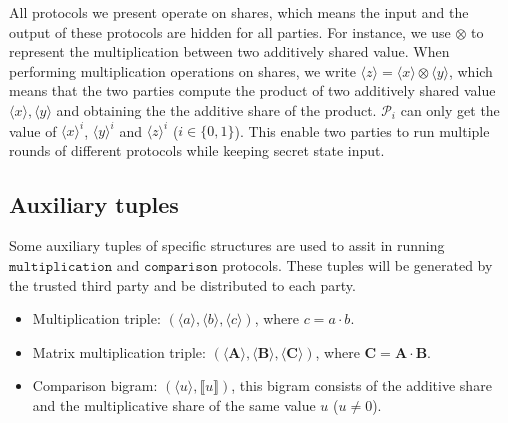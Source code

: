 \documentclass[letterpaper]{article} %
\begin{document}
    All protocols we present operate on shares, which means
    the input and the output of these protocols are hidden for all parties.
    For instance, we use $\otimes$ to represent the multiplication between two additively shared value.
    When performing multiplication operations on shares,
    we write $\langle z\rangle=\langle x\rangle\otimes  \langle y\rangle $,
    which means that the two parties compute the product of two additively shared value
    $\langle x\rangle, \langle y\rangle$ and obtaining the
    the additive share of the product.
    $\mathcal{P}_{i}$ can only get the value of $\langle x\rangle ^{i}$, $\langle y\rangle ^{i}$ and $\langle z\rangle ^{i}$ ($i \in \{0,1\}$).
    This enable two parties to run multiple rounds of different protocols while keeping secret state input.

    \subsection{Auxiliary tuples}
    Some auxiliary tuples of specific structures are used to
    assit in running $\mathtt{multiplication}$ and $\mathtt{comparison}$ protocols.
    These tuples will be generated by the trusted third party and be distributed to each party.
    \begin{itemize}
        \item Multiplication triple: $(\langle a\rangle,\langle b\rangle,\langle c\rangle)$, where $c=a\cdot b$.
        \item Matrix multiplication triple: $(\langle \mathbf{A}\rangle,\langle \mathbf{B}\rangle,\langle \mathbf{C}\rangle)$, where $\mathbf{C}=\mathbf{A}\cdot \mathbf{B}$.
        \item Comparison bigram: $(\langle u\rangle,\llbracket u \rrbracket)$,
        this bigram consists of the additive share and the multiplicative share of the same value $u$ ($u\neq 0 $).
    \end{itemize}
\end{document}
